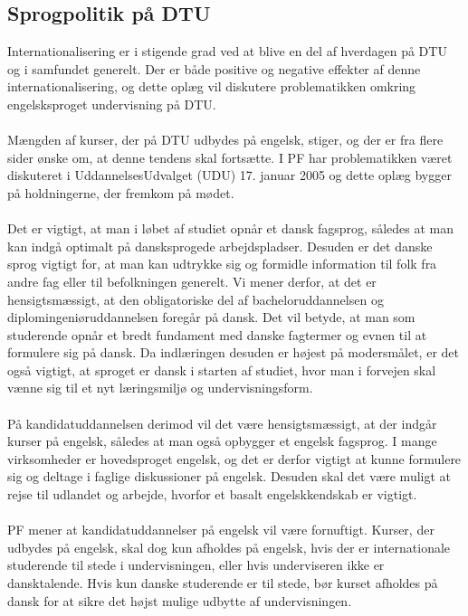 \subsection{Sprogpolitik på DTU}
Internationalisering er i stigende grad ved at blive en del af hverdagen på DTU og i samfundet generelt. Der er både positive og negative effekter af denne internationalisering, og dette oplæg vil diskutere problematikken omkring engelsksproget undervisning på DTU.\\
\\
Mængden af kurser, der på DTU udbydes på engelsk, stiger, og der er fra flere sider ønske om, at denne tendens skal fortsætte. I PF har problematikken været diskuteret i UddannelsesUdvalget (UDU) 17. januar 2005 og dette oplæg bygger på holdningerne, der fremkom på mødet.\\
\\
Det er vigtigt, at man i løbet af studiet opnår et dansk fagsprog, således at man kan indgå optimalt på dansksprogede arbejdspladser. Desuden er det danske sprog vigtigt for, at man kan udtrykke sig og formidle information til folk fra andre fag eller til befolkningen generelt. Vi mener derfor, at det er hensigtsmæssigt, at den obligatoriske del af bacheloruddannelsen og diplomingeniøruddannelsen foregår på dansk. Det vil betyde, at man som studerende opnår et bredt fundament med danske fagtermer og evnen til at formulere sig på dansk. Da indlæringen desuden er højest på modersmålet, er det også vigtigt, at sproget er dansk i starten af studiet, hvor man i forvejen skal vænne sig til et nyt læringsmiljø og undervisningsform.\\
\\
På kandidatuddannelsen derimod vil det være hensigtsmæssigt, at der indgår kurser på engelsk, således at man også opbygger et engelsk fagsprog. I mange virksomheder er hovedsproget engelsk, og det er derfor vigtigt at kunne formulere sig og deltage i faglige diskussioner på engelsk. Desuden skal det være muligt at rejse til udlandet og arbejde, hvorfor et basalt engelskkendskab er vigtigt.\\
\\
PF mener at kandidatuddannelser på engelsk vil være fornuftigt. Kurser, der udbydes på engelsk, skal dog kun afholdes på engelsk, hvis der er internationale studerende til stede i undervisningen, eller hvis underviseren ikke er dansktalende. Hvis kun danske studerende er til stede, bør kurset afholdes på dansk for at sikre det højst mulige udbytte af
undervisningen.\\

